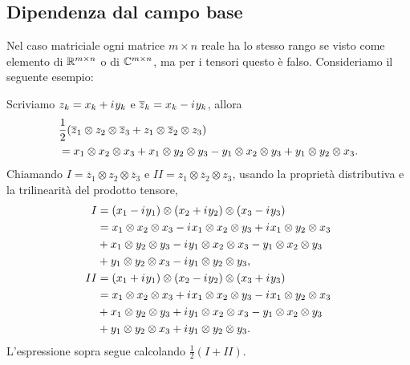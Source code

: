\subsection*{Dipendenza dal campo base}
Nel caso matriciale ogni matrice $ m \times n $ reale ha lo stesso
rango se visto come elemento di $ \mathbb{R}^{m\times n} $ o di $ \mathbb{C}^{m \times n} $, ma per i tensori questo è
falso. Consideriamo il seguente esempio:
\begin{example}
	Scriviamo $ z_{k} = x_{k} + {i\mkern1mu} y_{k} $ e $ \overline{z}_k = x_{k} - {i\mkern1mu} y_{k} $, allora
	\begin{equation}
		\begin{aligned}
			 & \frac{1}{2}\left( \overline{z}_1 \topp z_2 \topp \overline{z}_3 + z_1 \topp \overline{z}_2 \topp
			z_3\right)                                                                                          \\
			 & = x_1 \topp x_2 \topp x_3 + x_1 \topp y_2 \topp y_3 - y_1 \topp x_2 \topp
			y_3 + y_1 \topp y_2 \topp x_3.
		\end{aligned}
	\end{equation}
	Chiamando $ I = \overline{z}_{1} \otimes z_2 \otimes \overline{z}_3 $ e $ II = z_1 \otimes
		\overline{z}_{2} \otimes z_3 $, usando la proprietà distributiva e la trilinearità del prodotto
	tensore,
	\begin{equation*}
		\begin{aligned}
			I  & = (x_1 - {i\mkern1mu} y_1) \otimes (x_2 + {i\mkern1mu} y_2) \otimes (x_3 - {i\mkern1mu} y_3)                              \\
			   & = x_1 \otimes x_2 \otimes x_3 - {i\mkern1mu} x_1 \otimes x_2 \otimes y_3 + {i\mkern1mu} x_1 \otimes y_2 \otimes
			x_3                                                                                              \\
			   & + x_1 \otimes y_2 \otimes y_3 - {i\mkern1mu} y_1 \otimes x_2 \otimes x_3 - y_1 \otimes x_2 \otimes
			y_3                                                                                              \\
			   & + y_1 \otimes y_2 \otimes x_3 - {i\mkern1mu} y_1 \otimes y_2 \otimes y_3,                             \\
			II & = (x_1 + {i\mkern1mu} y_1) \otimes (x_2 - {i\mkern1mu} y_2) \otimes (x_3 + {i\mkern1mu} y_3)                              \\
			   & =x_1 \otimes x_2 \otimes x_3 + {i\mkern1mu} x_1 \otimes x_2 \otimes y_3 - {i\mkern1mu} x_1 \otimes y_2
			\otimes x_3                                                                                      \\
			   & + x_1 \otimes y_2 \otimes y_3 + {i\mkern1mu} y_1 \otimes x_2 \otimes x_3 - y_1 \otimes x_2 \otimes
			y_3                                                                                              \\
			   & + y_1 \otimes y_2 \otimes x_3 + {i\mkern1mu} y_1 \otimes y_2 \otimes y_3.
		\end{aligned}
	\end{equation*}
	L'espressione sopra segue calcolando $ \frac{1}{2}(I + II) $.

\end{example}


